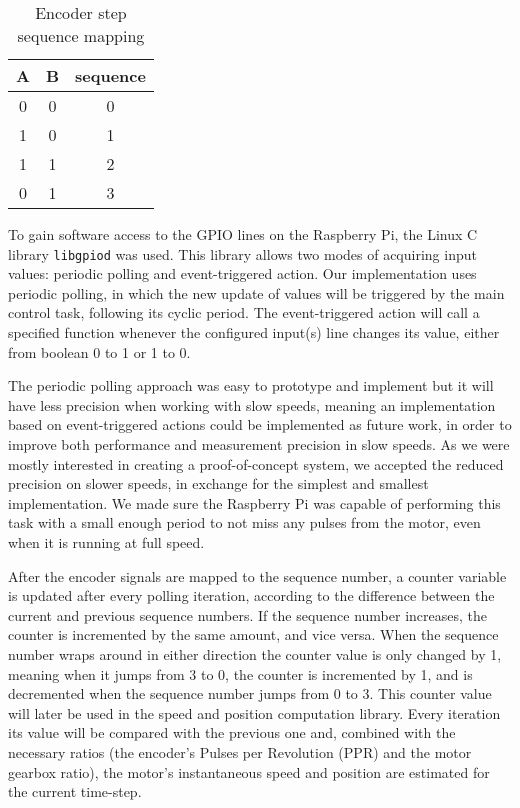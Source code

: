 \begin{table}[htp]
	\centering
	\caption{Encoder step sequence mapping}
	\label{table:encoder-ab-sequence}
	\begin{tabular}{|c|c|c|}
		\hline
		A & B & sequence  \\
		\hline
		0 & 0 & 0         \\
		\hline
		1 & 0 & 1         \\
		\hline
		1 & 1 & 2         \\
		\hline
		0 & 1 & 3         \\
		\hline
	\end{tabular}
\end{table}

To gain software access to the GPIO lines on the Raspberry Pi, the Linux C library \verb|libgpiod| \cite{lib:libgpiod} was used.
This library allows two modes of acquiring input values: periodic polling and event-triggered action.
Our implementation uses periodic polling, in which the new update of values will be triggered by the main control task, following its cyclic period.
The event-triggered action will call a specified function whenever the configured input(s) line changes its value, either from boolean 0 to 1 or 1 to 0.

The periodic polling approach was easy to prototype and implement but it will have less precision when working with slow speeds, meaning an implementation based on event-triggered actions could be implemented as future work, in order to improve both performance and measurement precision in slow speeds.
As we were mostly interested in creating a proof-of-concept system, we accepted the reduced precision on slower speeds, in exchange for the simplest and smallest implementation.
We made sure the Raspberry Pi was capable of performing this task with a small enough period to not miss any pulses from the motor, even when it is running at full speed.

After the encoder signals are mapped to the sequence number, a counter variable is updated after every polling iteration, according to the difference between the current and previous sequence numbers.
If the sequence number increases, the counter is incremented by the same amount, and vice versa.
When the sequence number wraps around in either direction the counter value is only changed by 1, meaning when it jumps from 3 to 0, the counter is incremented by 1, and is decremented when the sequence number jumps from 0 to 3.
This counter value will later be used in the speed and position computation library.
Every iteration its value will be compared with the previous one and, combined with the necessary ratios (the encoder's Pulses per Revolution (PPR) and the motor gearbox ratio), the motor's instantaneous speed and position are estimated for the current time-step.

